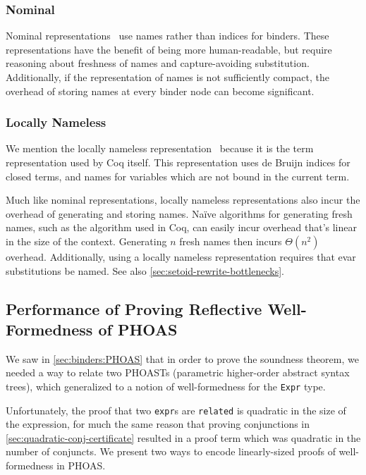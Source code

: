 \subsubsection{Nominal} \label{sec:binders:nominal}
Nominal representations~\cite{Nominal2003Pitts} use names rather than indices for binders.
These representations have the benefit of being more human-readable, but require reasoning about freshness of names and capture-avoiding substitution.
Additionally, if the representation of names is not sufficiently compact, the overhead of storing names at every binder node can become significant.

\subsubsection{Locally Nameless} \label{sec:binders:locally-nameless}
We mention the locally nameless representation~\cite{Locally2012Chargueraud,locally2007Leroy} because it is the term representation used by Coq itself.
This representation uses de Bruijn indices for closed terms, and names for variables which are not bound in the current term.

Much like nominal representations, locally nameless representations also incur the overhead of generating and storing names.
Naïve algorithms for generating fresh names, such as the algorithm used in Coq, can easily incur overhead that's linear in the size of the context.
Generating $n$ fresh names then incurs $\mathcal \Theta(n^2)$ overhead.
Additionally, using a locally nameless representation requires that evar substitutions be named.
See also \autoref{sec:setoid-rewrite-bottlenecks}.

\subsection{Performance of Proving Reflective Well-Formedness of PHOAS} \label{sec:wf:perf}

We saw in \autoref{sec:binders:PHOAS} that in order to prove the soundness theorem, we needed a way to relate two PHOASTs (parametric higher-order abstract syntax trees), which generalized to a notion of well-formedness for the \texttt{Expr} type.

Unfortunately, the proof that two \texttt{expr}s are \texttt{related} is quadratic in the size of the expression, for much the same reason that proving conjunctions in \autoref{sec:quadratic-conj-certificate} resulted in a proof term which was quadratic in the number of conjuncts.
We present two ways to encode linearly-sized proofs of well-formedness in PHOAS.

